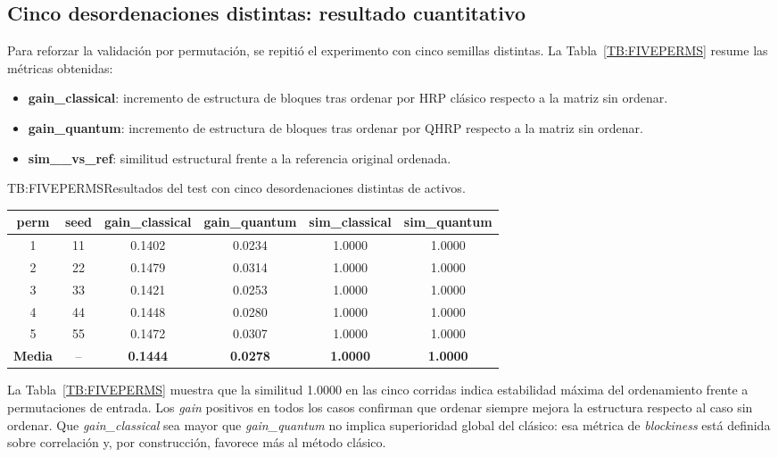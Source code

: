 \subsection{Cinco desordenaciones distintas: resultado cuantitativo}
Para reforzar la validación por permutación, se repitió el experimento con cinco semillas distintas. La Tabla~\ref{TB:FIVEPERMS} resume las métricas obtenidas:

\begin{itemize}
	\item \textbf{gain\_classical}: incremento de estructura de bloques tras ordenar por HRP clásico respecto a la matriz sin ordenar.
	\item \textbf{gain\_quantum}: incremento de estructura de bloques tras ordenar por QHRP respecto a la matriz sin ordenar.
	\item \textbf{sim\_\*\_vs\_ref}: similitud estructural frente a la referencia original ordenada.
\end{itemize}

\begin{table}[Cinco permutaciones de activos]{TB:FIVEPERMS}{Resultados del test con cinco desordenaciones distintas de activos.}
\begin{tabular}{cccccc}
\hline
\textbf{perm} & \textbf{seed} & \textbf{gain\_classical} & \textbf{gain\_quantum} & \textbf{sim\_classical} & \textbf{sim\_quantum} \\
\hline
1 & 11 & 0.1402 & 0.0234 & 1.0000 & 1.0000 \\
2 & 22 & 0.1479 & 0.0314 & 1.0000 & 1.0000 \\
3 & 33 & 0.1421 & 0.0253 & 1.0000 & 1.0000 \\
4 & 44 & 0.1448 & 0.0280 & 1.0000 & 1.0000 \\
5 & 55 & 0.1472 & 0.0307 & 1.0000 & 1.0000 \\
\hline
\textbf{Media} & -- & \textbf{0.1444} & \textbf{0.0278} & \textbf{1.0000} & \textbf{1.0000} \\
\hline
\end{tabular}
\end{table}

La Tabla~\ref{TB:FIVEPERMS} muestra que la similitud 1.0000 en las cinco corridas indica estabilidad máxima del ordenamiento frente a permutaciones de entrada. Los \textit{gain} positivos en todos los casos confirman que ordenar siempre mejora la estructura respecto al caso sin ordenar. Que \textit{gain\_classical} sea mayor que \textit{gain\_quantum} no implica superioridad global del clásico: esa métrica de \textit{blockiness} está definida sobre correlación y, por construcción, favorece más al método clásico.

